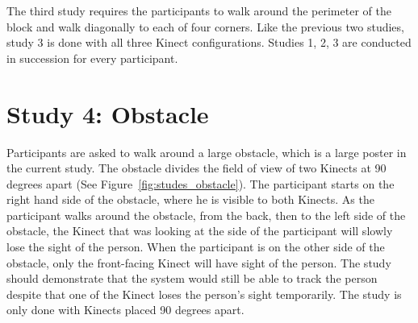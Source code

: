 The third study requires the participants to walk around the perimeter of the block and walk diagonally to each of four corners. Like the previous two studies, study 3 is done with all three Kinect configurations. Studies 1, 2, 3 are conducted in succession for every participant.

\section{Study 4: Obstacle}
\label{sec:studies_stationary}

Participants are asked to walk around a large obstacle, which is a large poster in the current study. The obstacle divides the field of view of two Kinects at 90 degrees apart (See Figure~\ref{fig:studes_obstacle}). The participant starts on the right hand side of the obstacle, where he is visible to both Kinects. As the participant walks around the obstacle, from the back, then to the left side of the obstacle, the Kinect that was looking at the side of the participant will slowly lose the sight of the person. When the participant is on the other side of the obstacle, only the front-facing Kinect will have sight of the person. The study should demonstrate that the system would still be able to track the person despite that one of the Kinect loses the person's sight temporarily. The study is only done with Kinects placed 90 degrees apart.


